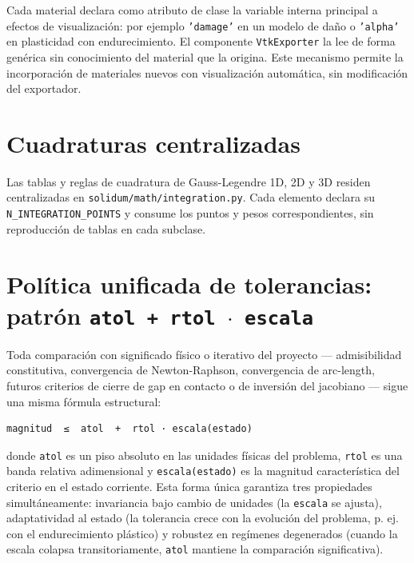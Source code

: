 \documentclass[11pt,oneside]{report}
\begin{document}
Cada material declara como atributo de clase la variable interna principal a efectos de visualización: por ejemplo \texttt{'damage'} en un modelo de daño o \texttt{'alpha'} en plasticidad con endurecimiento. El componente \texttt{VtkExporter} la lee de forma genérica sin conocimiento del material que la origina. Este mecanismo permite la incorporación de materiales nuevos con visualización automática, sin modificación del exportador.

\section{Cuadraturas centralizadas}

Las tablas y reglas de cuadratura de Gauss-Legendre 1D, 2D y 3D residen centralizadas en \texttt{solidum/\allowbreak{}math/\allowbreak{}integration.\allowbreak{}py}. Cada elemento declara su \texttt{N\_\allowbreak{}INTEGRATION\_\allowbreak{}POINTS} y consume los puntos y pesos correspondientes, sin reproducción de tablas en cada subclase.

\section{Política unificada de tolerancias: patrón \texttt{atol + rtol \ensuremath{\cdot} escala}}

Toda comparación con significado físico o iterativo del proyecto --- admisibilidad constitutiva, convergencia de Newton-Raphson, convergencia de arc-length, futuros criterios de cierre de gap en contacto o de inversión del jacobiano --- sigue una misma fórmula estructural:

\begin{lstlisting}
magnitud  ≤  atol  +  rtol · escala(estado)

\end{lstlisting}

donde \texttt{atol} es un piso absoluto en las unidades físicas del problema, \texttt{rtol} es una banda relativa adimensional y \texttt{escala(estado)} es la magnitud característica del criterio en el estado corriente. Esta forma única garantiza tres propiedades simultáneamente: invariancia bajo cambio de unidades (la \texttt{escala} se ajusta), adaptatividad al estado (la tolerancia crece con la evolución del problema, p. ej. con el endurecimiento plástico) y robustez en regímenes degenerados (cuando la escala colapsa transitoriamente, \texttt{atol} mantiene la comparación significativa).
\end{document}
